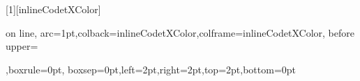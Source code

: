 
\newtcbox{\inlineCodetcbox}[1][inlineCodetXColor]{on line,
  arc=1pt,colback=inlineCodetXColor,colframe=inlineCodetXColor,
  before upper={\rule[-3pt]{0pt}{10pt}},boxrule=0pt,
  boxsep=0pt,left=2pt,right=2pt,top=2pt,bottom=0pt}



\newcommand{\alexlistingcaption}[3]{\caption[#2]{#2\ifIncludeFigures, Quelle: Eigenes Listing, Datei: \url{#3}\fi}}


\newenvironment{alexlisting}[4]
{%
  \begin{listing}[ht]%
    \ifIncludeFigures
    \begin{codeFrame}
        \inputminted[#4]{dart}{#3}%
    \end{codeFrame}
    \fi
    \alexlistingcaption{#1}{#2}{#3}%
    }%
    {%
  \end{listing}%
}


\newenvironment{alexyamllisting}[4]
{%
  \begin{listing}[ht]%
    \ifIncludeFigures

    \begin{codeFrame}
        \inputminted[#4]{yaml}{#3}%
    \end{codeFrame}
    \fi

    \alexlistingcaption{#1}{#2}{#3}%

    }%
    {%
  \end{listing}%
}

\newcommand{\fremdeslistingcaption}[4]{\caption[#1 #2]{#2, Quelle: #4, Datei: \url{#3}}}
\newenvironment{fremdeslisting}[6]
{%
    \begin{listing}[ht]%
      \ifIncludeFigures
      \begin{codeFrame}

      \inputminted[#4]{#6}{#3}%

    \end{codeFrame}
    \fi

      \ifIncludeFigures
      \fremdeslistingcaption{#1}{#2}{#3}{#5}%
      \else
      \caption[#1]{#2}
      \fi
            }%
      {%
    \end{listing}%
}

